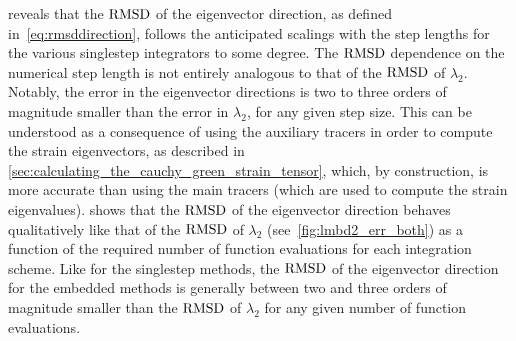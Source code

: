  reveals that the $\operatorname{RMSD}$ of the eigenvector direction,
as defined in~\cref{eq:rmsddirection}, follows the anticipated scalings with
the step lengths for the various singlestep integrators to some degree. The
$\operatorname{RMSD}$ dependence on the numerical step length is not entirely analogous to
that of the $\operatorname{RMSD}$ of $\lambda_{2}$. Notably, the error in the eigenvector
directions is two to three orders of magnitude smaller than the error
in $\lambda_{2}$, for any given step size. This can be understood as a
consequence of using the auxiliary tracers in order to compute the strain
eigenvectors, as described in
\cref{sec:calculating_the_cauchy_green_strain_tensor}, which, by construction,
is more accurate than using the main tracers (which are used to
compute the strain eigenvalues).  shows that the $\operatorname{RMSD}$ of
the eigenvector direction behaves qualitatively like that of the
$\operatorname{RMSD}$ of $\lambda_{2}$ (see~\cref{fig:lmbd2_err_both}) as a function
of the required number of function evaluations for each integration scheme.
Like for the singlestep methods, the $\operatorname{RMSD}$ of the eigenvector direction for
the embedded methods is generally between two and three orders of magnitude
smaller than the $\operatorname{RMSD}$ of $\lambda_{2}$ for any given number of function
evaluations.

